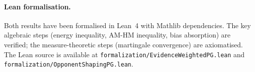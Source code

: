 \paragraph{Lean formalisation.} Both results have been formalised in Lean~4 with Mathlib dependencies. The key algebraic steps (energy inequality, AM-HM inequality, bias absorption) are verified; the measure-theoretic steps (martingale convergence) are axiomatised. The Lean source is available at \texttt{formalization/EvidenceWeightedPG.lean} and \texttt{formalization/OpponentShapingPG.lean}.
